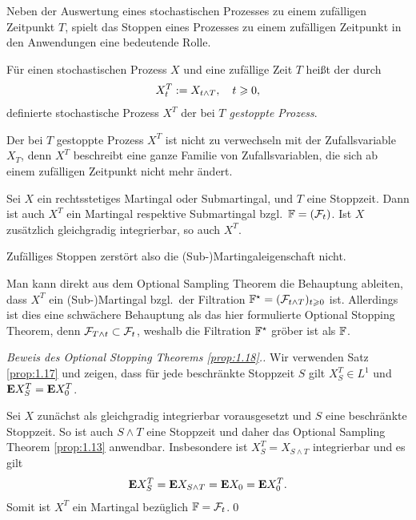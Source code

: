 Neben der Auswertung eines stochastischen Prozesses zu einem zufälligen
Zeitpunkt $T$, spielt das Stoppen eines Prozesses zu einem zufälligen Zeitpunkt
in den Anwendungen eine bedeutende Rolle.

\begin{defn}
\label{defn:1.11}
Für einen stochastischen Prozess $X$ und eine zufällige Zeit $T$ heißt der
durch
\begin{align*}
X_t^T:= X_{t \wedge T}, \quad t\geqslant0,
\end{align*}
definierte stochastische Prozess $X^T$ der bei \emph{$T$ gestoppte Prozess}.
\end{defn}

Der bei $T$ gestoppte Prozess $X^T$ ist nicht zu verwechseln mit der
Zufallsvariable $X_T$, denn $X^T$ beschreibt eine ganze Familie von
Zufallsvariablen, die sich ab einem zufälligen Zeitpunkt nicht mehr ändert.

\begin{prop}
\label{prop:1.18}
Sei $X$ ein rechtsstetiges Martingal oder Submartingal, und $T$ eine Stoppzeit.
Dann ist auch $X^T$ ein Martingal respektive Submartingal bzgl.\ $\mathbb{F}=(\mathcal{F}_t)$.
Ist $X$ zusätzlich gleichgradig integrierbar, so auch $X^T$.\fish
\end{prop}

Zufälliges Stoppen zerstört also die (Sub-)Martingaleigenschaft nicht.

\begin{rem*}
Man kann direkt aus dem Optional Sampling Theorem die Behauptung
ableiten, dass $X^T$ ein (Sub-)Martingal bzgl.\ der Filtration
$\mathbb{F}^\star=(\mathcal{F}_{t\wedge T})_{t\geqslant 0}$ ist. Allerdings ist dies eine schwächere
Behauptung als das hier formulierte Optional Stopping Theorem, denn
$\mathcal{F}_{T\wedge t}\subset \mathcal{F}_t$, weshalb die Filtration $\mathbb{F}^\star$ gröber ist
als $\mathbb{F}$.\map
\end{rem*}

\begin{proof}[Beweis des Optional Stopping Theorems \ref{prop:1.18}.]
Wir verwenden Satz \ref{prop:1.17} und zeigen, dass für jede beschränkte
Stoppzeit $S$ gilt $X^T_S\in L^1$ und $\mathbf{E} X_S^T = \mathbf{E} X_0^T$.

Sei $X$ zunächst als gleichgradig integrierbar vorausgesetzt und $S$ eine
beschränkte Stoppzeit. So ist auch $S\wedge T$ eine Stoppzeit und daher das
Optional Sampling Theorem \ref{prop:1.13} anwendbar. Insbesondere ist
$X_S^T = X_{S\wedge T}$ integrierbar und es gilt
\begin{align*}
\mathbf{E} X_S^T = \mathbf{E} X_{S\wedge T} = \mathbf{E} X_0 = \mathbf{E} X_0^T.
\end{align*}
Somit ist $X^T$ ein Martingal bezüglich $\mathbb{F} = \mathcal{F}_t$.\qed
\end{proof}

